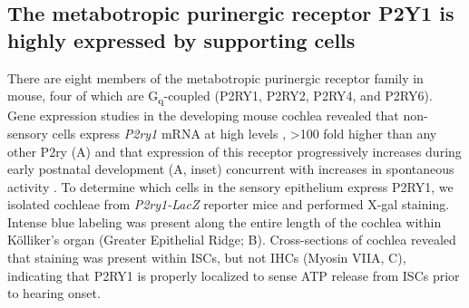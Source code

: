 \documentclass[9pt,lineno]{elife}
\begin{document}
\subsection{The metabotropic purinergic receptor P2Y1 is highly expressed by supporting cells}
There are eight members of the metabotropic purinergic receptor family in mouse, four of which are G\textsubscript{q}-coupled (P2RY1, P2RY2, P2RY4, and P2RY6). Gene expression studies in the developing mouse cochlea revealed that non-sensory cells express \textit{P2ry1} mRNA at high levels \citep{Scheffer2015}, >100 fold higher than any other P2ry (A) and that expression of this receptor progressively increases during early postnatal development (A, inset) concurrent with increases in spontaneous activity \citep{Tritsch2010}. To determine which cells in the sensory epithelium express P2RY1, we isolated cochleae from \textit{P2ry1-LacZ} reporter mice and performed X-gal staining. Intense blue labeling was present along the entire length of the cochlea within Kölliker’s organ (Greater Epithelial Ridge; B). Cross-sections of cochlea revealed that staining was present within ISCs, but not IHCs (Myosin VIIA, C), indicating that P2RY1 is properly localized to sense ATP release from ISCs prior to hearing onset.
\end{document}
